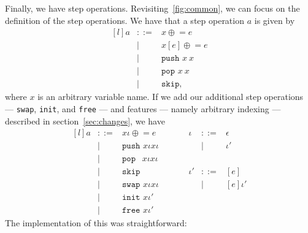 Finally, we have step operations. Revisiting~\ref{fig:common}, we can focus on the definition of the step operations. We have that a step operation $a$ is given by
\[
\begin{matrix*}[l]
  {a} & ::= & {x}\mathrel{\oplus}= e \\
             &  |  & {x}[ e]\mathrel{\oplus}= e \\
             &  |  & \texttt{push }{x}\ {x} \\
             &  |  & \texttt{pop  }{x}\ {x} \\
             &  |  & \texttt{skip},
\end{matrix*}
\]
where $x$ is an arbitrary variable name. If we add our additional step operations --- \texttt{swap}, \texttt{init}, and \texttt{free} --- and features --- namely arbitrary indexing --- described in section~\ref{sec:changes}, we have
\[
\begin{matrix*}[l]
  {a} & ::= & {x}\iota\mathrel{\oplus}= e       \quad\quad\quad  & \iota  & ::= & \epsilon \\
      &  |  & \texttt{push }{x}\iota \mathbin{} {x}\iota                   &        & |   & \iota' \\
      &  |  & \texttt{pop } \ \ {x}\iota \mathbin{} {x}\iota \\
      &  |  & \texttt{skip }                                      & \iota' & ::= & [e] \\
      &  |  & \texttt{swap } x\iota \mathbin{} x\iota                    &        & |   & [e]\iota' \\
      &  |  & \texttt{init } x \mathbin{} \iota' \\
      &  |  & \texttt{free } x \mathbin{} \iota'
\end{matrix*}
\]
The implementation of this was straightforward:


